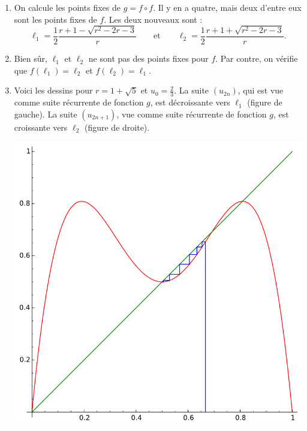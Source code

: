 \documentclass[class=report,crop=false]{standalone}
\begin{document}
\begin{enumerate}
  \begin{enumerate}
    \item On calcule les points fixes de $g = f\circ f$. Il y en a quatre, mais deux d'entre eux sont 
    les points fixes de $f$. Les deux nouveaux sont :
    $$\ell_1 = \frac12\frac{r + 1 - \sqrt{r^2 - 2r - 3}}{r} \qquad \mbox{et} \qquad 
      \ell_2 = \frac12\frac{r + 1 + \sqrt{r^2 - 2r - 3}}{r}.$$
      
    \item Bien sûr, $\ell_1$ et $\ell_2$ ne sont pas des points fixes pour $f$.
    Par contre, on vérifie que $f(\ell_1) = \ell_2$ et $f(\ell_2)=\ell_1$.
     
    \item Voici les dessins pour $r=1+\sqrt{5}$ et $u_0=\frac23$.
    La suite $(u_{2n})$, qui est vue comme suite récurrente de fonction $g$,
    est décroissante vers $\ell_1$ (figure de gauche).
    La suite $(u_{2n+1})$, vue comme suite récurrente de fonction $g$,
    est croissante vers $\ell_2$ (figure de droite).
  \begin{center}
  \includegraphics[scale=0.3]{figures/chaos7}\quad

\end{center}
\end{enumerate}
\end{enumerate}
\end{document}
